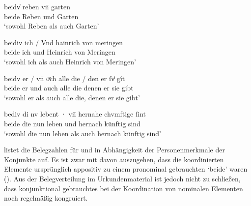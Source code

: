 \begin{exe}
\ex \label{ex:caokonj2ctrl}
	\begin{xlist}
	\ex \label{ex:caokonj2ctrl_1}
		\gll beidv̍ reben vn̄ garten \\
			beide Reben und Garten \\
		\trans `sowohl Reben als auch Garten'
			\parencites(Nr.~2353, Basel, 1296)[462,28--29]{cao3}

	\ex \label{ex:caokonj2ctrl_2}
		\gll beidiv ich / Vnd hainrich von meringen \\
			beide ich {} und Heinrich von Meringen \\
		\trans `sowohl ich als auch Heinrich von Meringen'
			\parencites(Nr.~1347, Kl.~Steingaden, Kr.~Weilheim-Schongau, 1291)[578,25]{cao1}

	\ex \label{ex:caokonj2ctrl_3}
		\gll beidv er / vn̄ oͮch alle die / den er ſvͥ gît \\
			beide er {} und auch alle die {} denen er sie gibt \\
		\trans `sowohl er als auch alle die, denen er sie gibt'
			\parencites(Nr.~1566, Hüfingen, Schwarzwald-Baar-Kr., 1292)[717,18]{cao2}

	\ex \label{ex:caokonj2ctrl_4}
		\gll bediv di nv lebent · vn̄ hernahe chvmftige ſint \\
			beide die nun leben {} und hernach künftig sind \\
		\trans `sowohl die nun leben als auch hernach künftig sind'
			\parencites(Nr.~1352, Wien, 1291)[580,8]{cao2}
	\end{xlist}
\end{exe}

 listet die Belegzahlen für  und
 in Abhängigkeit der Personenmerkmale der
Konjunkte auf. Es ist zwar mit \citet[626]{ksw2} davon auszugehen, dass die
koordinierten Elemente ursprünglich appositiv zu einem
pronominal gebrauchten `beide' waren ().
Aus der Belegverteilung im Urkundenmaterial ist jedoch nicht
 zu schließen, dass konjunktional gebrauchtes  bei der
Koordination von nominalen Elementen noch regelmäßig kongruiert.

